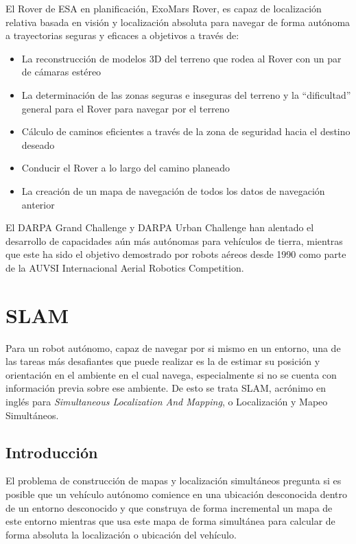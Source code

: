 El Rover de ESA en planificación, ExoMars Rover, es capaz de localización relativa basada en visión y localización absoluta para navegar de forma autónoma a trayectorias seguras y eficaces a objetivos a través de:

\begin{itemize}
	\itemsep1pt \parskip1pt 
	\item La reconstrucción de modelos 3D del terreno que rodea al Rover con un par de cámaras estéreo
	\item La determinación de las zonas seguras e inseguras del terreno y la ``dificultad'' general para el Rover para navegar por el terreno
	\item Cálculo de caminos eficientes a través de la zona de seguridad hacia el destino deseado
	\item Conducir el Rover a lo largo del camino planeado
	\item La creación de un mapa de navegación de todos los datos de navegación anterior
\end{itemize}

El DARPA Grand Challenge y DARPA Urban Challenge han alentado el desarrollo de capacidades aún más autónomas para vehículos de tierra, mientras que este ha sido el objetivo demostrado por robots aéreos desde 1990 como parte de la AUVSI Internacional Aerial Robotics Competition.

\section{SLAM}
\label{sec:slam}
Para un robot autónomo, capaz de navegar por si mismo en un entorno, una de las tareas más desafiantes que puede realizar es la de estimar su posición y orientación en el ambiente en el cual navega, especialmente si no se cuenta con información previa sobre ese ambiente. De esto se trata SLAM, acrónimo en inglés para \textit{Simultaneous Localization And Mapping}, o Localización y Mapeo Simultáneos.

\subsection{Introducción}
El problema de construcción de mapas y localización simultáneos pregunta si es posible que un vehículo autónomo comience en una ubicación desconocida dentro de un entorno desconocido y que construya de forma incremental un mapa de este entorno mientras que usa este mapa de forma simultánea para calcular de forma absoluta la localización o ubicación del vehículo.

